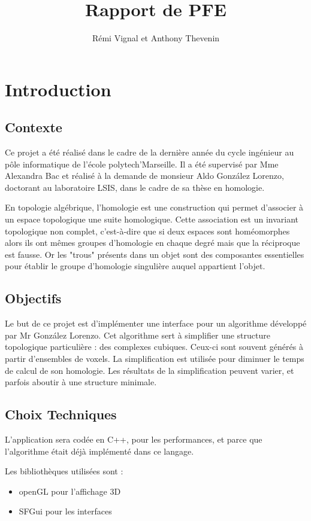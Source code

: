 \documentclass[10pt,a4paper]{report}
\author{Rémi Vignal et Anthony Thevenin}
\title{Rapport de PFE}
\begin{document}
\maketitle

\chapter{Introduction}

\section{Contexte}
Ce projet a été réalisé dans le cadre de la dernière année du cycle ingénieur au pôle informatique de l'école polytech'Marseille. Il a été supervisé par Mme Alexandra Bac et réalisé à la demande de monsieur Aldo González Lorenzo, doctorant au laboratoire LSIS, dans le cadre de sa thèse en homologie.

En topologie algébrique, l'homologie est une construction qui permet d'associer à un espace topologique une suite homologique. Cette association est un invariant topologique non complet, c'est-à-dire que si deux espaces sont homéomorphes alors ils ont mêmes groupes d'homologie en chaque degré mais que la réciproque est fausse.
Or les "trous" présents dans un objet sont des composantes essentielles pour établir le groupe d'homologie singulière auquel appartient l'objet.
 
\section{Objectifs}
Le but de ce projet est d'implémenter une interface pour un algorithme développé par Mr González Lorenzo.
Cet algorithme sert à simplifier une structure topologique particulière : des complexes cubiques. Ceux-ci sont souvent générés à partir d'ensembles de voxels. La simplification est utilisée pour diminuer le temps de calcul de son homologie. Les résultats de la simplification peuvent varier, et parfois aboutir à une structure minimale.

\section{Choix Techniques}

L'application sera codée en C++, pour les performances, et parce que l'algorithme était déjà implémenté dans ce langage.

Les bibliothèques utilisées sont :
\begin{itemize}
\item openGL pour l'affichage 3D
\item SFGui pour les interfaces
\end{itemize}
\end{document}
